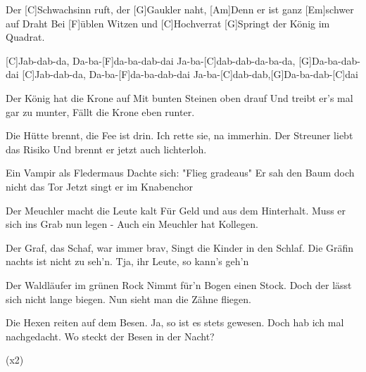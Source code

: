

\begin{guitar}
	
	Der [C]Schwachsinn ruft, der [G]Gaukler naht,
	[Am]Denn er ist ganz [Em]schwer auf Draht
	Bei [F]{ü}blen Witzen und [C]Hochverrat
	[G]Springt der König im Quadrat.
	
	[C]Jab-dab-da, Da-ba-[F]da-ba-dab-dai
	Ja-ba-[C]dab-dab-da-ba-da, [G]Da-ba-dab-dai
	[C]Jab-dab-da, Da-ba-[F]da-ba-dab-dai
	Ja-ba-[C]dab-dab,[G]Da-ba-dab-[C]dai
	
	Der König hat die Krone auf
	Mit bunten Steinen oben drauf
	Und treibt er's mal gar zu munter,
	Fällt die Krone eben runter.
	
	 
	
	Die Hütte brennt, die Fee ist drin.
	Ich rette sie, na immerhin.
	Der Streuner liebt das Risiko
	Und brennt er jetzt auch lichterloh.
	
	 
	
	Ein Vampir als Fledermaus
	Dachte sich: "Flieg gradeaus"
	Er sah den Baum doch nicht das Tor
	Jetzt singt er im Knabenchor
	
	 
	
	\pagebreak
	
	Der Meuchler macht die Leute kalt
	Für Geld und aus dem Hinterhalt.
	Muss er sich ins Grab nun legen -
	Auch ein Meuchler hat Kollegen.
	
	 
	
	Der Graf, das Schaf, war immer brav,
	Singt die Kinder in den Schlaf.
	Die Gräfin nachts ist nicht zu seh'n.
	Tja, ihr Leute, so kann's geh'n
	
	 
	
	Der Waldläufer im grünen Rock
	Nimmt für'n Bogen einen Stock.
	Doch der lässt sich nicht lange biegen.
	Nun sieht man die Zähne fliegen.
	
	 
	
	Die Hexen reiten auf dem Besen.
	Ja, so ist es stets gewesen.
	Doch hab ich mal nachgedacht.
	Wo steckt der Besen in der Nacht?
	
	  (x2)
	
\end{guitar}